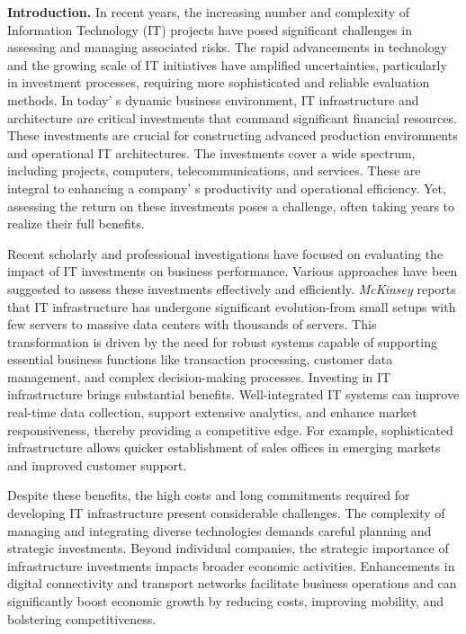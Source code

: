 \begin{multicols}{2}
{\bfseries Introduction.} In recent years, the increasing number and
complexity of Information Technology (IT) projects have posed
significant challenges in assessing and managing associated risks. The
rapid advancements in technology and the growing scale of IT initiatives
have amplified uncertainties, particularly in investment processes,
requiring more sophisticated and reliable evaluation methods. In
today' s dynamic business environment, IT infrastructure
and architecture are critical investments that command significant
financial resources. These investments are crucial for constructing
advanced production environments and operational IT architectures. The
investments cover a wide spectrum, including projects, computers,
telecommunications, and services. These are integral to enhancing a
company' s productivity and operational efficiency. Yet,
assessing the return on these investments poses a challenge, often
taking years to realize their full benefits.

Recent scholarly and professional investigations have focused on
evaluating the impact of IT investments on business performance. Various
approaches have been suggested to assess these investments effectively
and efficiently. \emph{McKinsey} reports that IT infrastructure has
undergone significant evolution-from small setups with few servers to
massive data centers with thousands of servers. This transformation is
driven by the need for robust systems capable of supporting essential
business functions like transaction processing, customer data
management, and complex decision-making processes. Investing in IT
infrastructure brings substantial benefits. Well-integrated IT systems
can improve real-time data collection, support extensive analytics, and
enhance market responsiveness, thereby providing a competitive edge. For
example, sophisticated infrastructure allows quicker establishment of
sales offices in emerging markets and improved customer support.

Despite these benefits, the high costs and long commitments required for
developing IT infrastructure present considerable challenges. The
complexity of managing and integrating diverse technologies demands
careful planning and strategic investments. Beyond individual companies,
the strategic importance of infrastructure investments impacts broader
economic activities. Enhancements in digital connectivity and transport
networks facilitate business operations and can significantly boost
economic growth by reducing costs, improving mobility, and bolstering
competitiveness.


\end{multicols}
